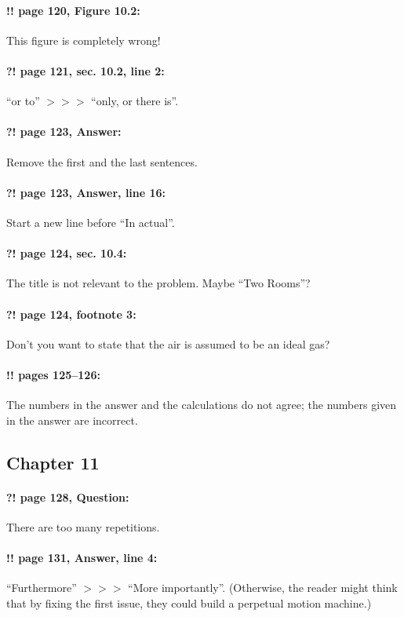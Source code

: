 \documentclass[twoside]{article}
\begin{document}
\paragraph{!! page 120, Figure 10.2:} This figure is completely wrong!

\paragraph{?! page 121, sec. 10.2, line 2:} ``or to'' $>\!>\!>$ ``only, or there is''.

\paragraph{?! page 123, Answer:} Remove the first and the last sentences.

\paragraph{?! page 123, Answer, line 16:} Start a new line before ``In actual''.

\paragraph{?! page 124, sec. 10.4:} The title is not relevant to the problem. Maybe ``Two Rooms''?

\paragraph{?! page 124, footnote 3:} Don’t you want to state that the air is assumed to be an ideal gas?

\paragraph{!! pages 125--126:} The numbers in the answer and the calculations do not agree; the numbers given in the answer are incorrect.

\subsection*{Chapter 11}

\paragraph{?! page 128, Question:} There are too many repetitions.

\paragraph{!! page 131, Answer, line 4:} ``Furthermore'' $>\!>\!>$ ``More importantly''. (Otherwise, the reader might think that by fixing the first issue, they could build a perpetual motion machine.)
\end{document}
